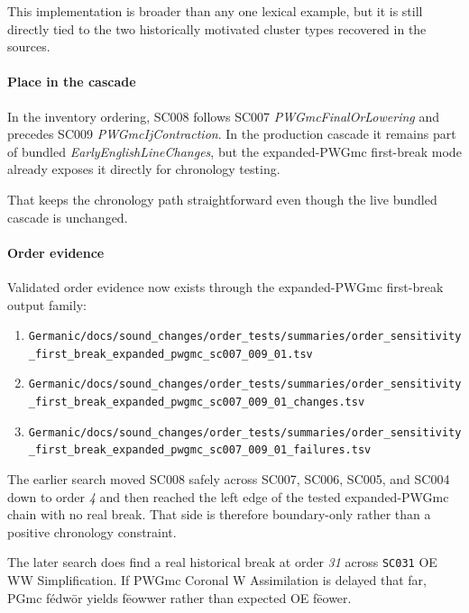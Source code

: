 \documentclass[
  british,
  a4paper,
]{article}
\providecommand{\tightlist}{%
  \setlength{\itemsep}{0pt}\setlength{\parskip}{0pt}}
\begin{document}
This implementation is broader than any one lexical example, but it is
still directly tied to the two historically motivated cluster types
recovered in the sources.

\paragraph{Place in the cascade}\label{place-in-the-cascade-5}

In the inventory ordering, SC008 follows SC007
\emph{PWGmcFinalOrLowering} and precedes SC009
\emph{PWGmcIjContraction}. In the production cascade it remains part of
bundled \emph{EarlyEnglishLineChanges}, but the expanded-PWGmc
first-break mode already exposes it directly for chronology testing.

That keeps the chronology path straightforward even though the live
bundled cascade is unchanged.

\paragraph{Order evidence}\label{order-evidence-5}

Validated order evidence now exists through the expanded-PWGmc
first-break output family:

\begin{enumerate}
\def\labelenumi{\arabic{enumi}.}
\tightlist
\item
  \texttt{Germanic/docs/sound\_changes/order\_tests/summaries/order\_sensitivity\_first\_break\_expanded\_pwgmc\_sc007\_009\_01.tsv}
\item
  \texttt{Germanic/docs/sound\_changes/order\_tests/summaries/order\_sensitivity\_first\_break\_expanded\_pwgmc\_sc007\_009\_01\_changes.tsv}
\item
  \texttt{Germanic/docs/sound\_changes/order\_tests/summaries/order\_sensitivity\_first\_break\_expanded\_pwgmc\_sc007\_009\_01\_failures.tsv}
\end{enumerate}

The earlier search moved SC008 safely across SC007, SC006, SC005, and
SC004 down to order \emph{4} and then reached the left edge of the
tested expanded-PWGmc chain with no real break. That side is therefore
boundary-only rather than a positive chronology constraint.

The later search does find a real historical break at order \emph{31}
across \texttt{SC031} OE WW Simplification. If PWGmc Coronal W
Assimilation is delayed that far, PGmc fédwōr yields fēowwer rather than
expected OE fēower.
\end{document}
